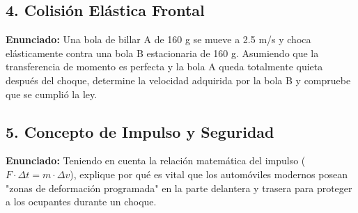 \documentclass[12pt, letterpaper]{article}
\begin{document}
	
	\subsection*{4. Colisión Elástica Frontal}
	\noindent \textbf{Enunciado:} Una bola de billar A de 160 g se mueve a 2.5 m/s y choca elásticamente contra una bola B estacionaria de 160 g. Asumiendo que la transferencia de momento es perfecta y la bola A queda totalmente quieta después del choque, determine la velocidad adquirida por la bola B y compruebe que se cumplió la ley.
	
	
	\subsection*{5. Concepto de Impulso y Seguridad}
	\noindent \textbf{Enunciado:} Teniendo en cuenta la relación matemática del impulso ($F \cdot \Delta t = m \cdot \Delta v$), explique por qué es vital que los automóviles modernos posean "zonas de deformación programada" en la parte delantera y trasera para proteger a los ocupantes durante un choque.
	
\end{document}
